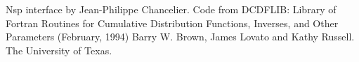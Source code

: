 \begin{program}
\end{program}

\begin{authors}
  Nsp interface by Jean-Philippe Chancelier. Code from DCDFLIB: 
  Library of Fortran Routines for Cumulative Distribution
  Functions, Inverses, and Other Parameters (February, 1994)
  Barry W. Brown, James Lovato and Kathy Russell. The University of Texas.
\end{authors}
